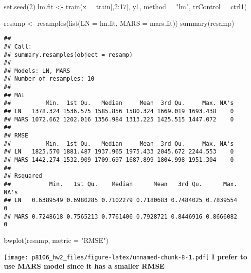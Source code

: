 \documentclass[
]{article}
\newenvironment{Shaded}{\begin{snugshade}}{\end{snugshade}}
\newcommand{\AttributeTok}[1]{\textcolor[rgb]{0.77,0.63,0.00}{#1}}
\newcommand{\DecValTok}[1]{\textcolor[rgb]{0.00,0.00,0.81}{#1}}
\newcommand{\FunctionTok}[1]{\textcolor[rgb]{0.00,0.00,0.00}{#1}}
\newcommand{\NormalTok}[1]{#1}
\newcommand{\OtherTok}[1]{\textcolor[rgb]{0.56,0.35,0.01}{#1}}
\newcommand{\SpecialCharTok}[1]{\textcolor[rgb]{0.00,0.00,0.00}{#1}}
\newcommand{\StringTok}[1]{\textcolor[rgb]{0.31,0.60,0.02}{#1}}
\begin{document}
\begin{Shaded}
\begin{Highlighting}[]
\FunctionTok{set.seed}\NormalTok{(}\DecValTok{2}\NormalTok{)}
\NormalTok{lm.fit }\OtherTok{\textless{}{-}} \FunctionTok{train}\NormalTok{(}\AttributeTok{x =}\NormalTok{ train[,}\DecValTok{2}\SpecialCharTok{:}\DecValTok{17}\NormalTok{], }
\NormalTok{                  y1,}
                  \AttributeTok{method =} \StringTok{"lm"}\NormalTok{,}
                  \AttributeTok{trControl =}\NormalTok{ ctrl1)}
\end{Highlighting}
\end{Shaded}

\begin{Shaded}
\begin{Highlighting}[]
\NormalTok{resamp }\OtherTok{\textless{}{-}} \FunctionTok{resamples}\NormalTok{(}\FunctionTok{list}\NormalTok{(}\AttributeTok{LN =}\NormalTok{ lm.fit,}
                         \AttributeTok{MARS =}\NormalTok{ mars.fit))}
\FunctionTok{summary}\NormalTok{(resamp)}
\end{Highlighting}
\end{Shaded}

\begin{verbatim}
## 
## Call:
## summary.resamples(object = resamp)
## 
## Models: LN, MARS 
## Number of resamples: 10 
## 
## MAE 
##          Min.  1st Qu.   Median     Mean  3rd Qu.     Max. NA's
## LN   1378.324 1536.575 1585.856 1580.324 1669.019 1693.438    0
## MARS 1072.662 1202.016 1356.984 1313.225 1425.515 1447.072    0
## 
## RMSE 
##          Min.  1st Qu.   Median     Mean  3rd Qu.     Max. NA's
## LN   1825.570 1881.487 1937.965 1975.433 2045.672 2244.553    0
## MARS 1442.274 1532.909 1709.697 1687.899 1804.998 1951.304    0
## 
## Rsquared 
##           Min.   1st Qu.    Median      Mean   3rd Qu.      Max. NA's
## LN   0.6389549 0.6980285 0.7102279 0.7180683 0.7484025 0.7839554    0
## MARS 0.7248618 0.7565213 0.7761406 0.7928721 0.8446916 0.8666082    0
\end{verbatim}

\begin{Shaded}
\begin{Highlighting}[]
\FunctionTok{bwplot}\NormalTok{(resamp, }\AttributeTok{metric =} \StringTok{"RMSE"}\NormalTok{)}
\end{Highlighting}
\end{Shaded}

\texttt{[image: p8106\_hw2\_files/figure-latex/unnamed-chunk-8-1.pdf]}
\textbf{I prefer to use MARS model since it has a smaller RMSE}
\end{document}
